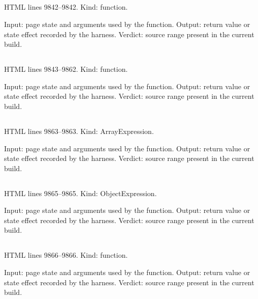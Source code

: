 \subsection*{\texttt{}}
\label{vf_538_curveSignal}
HTML lines 9842--9842. Kind: function.

Input: page state and arguments used by the function.
Output: return value or state effect recorded by the harness.
Verdict: source range present in the current build.

\subsection*{\texttt{}}
\label{vf_539_curveRowsSelected}
HTML lines 9843--9862. Kind: function.

Input: page state and arguments used by the function.
Output: return value or state effect recorded by the harness.
Verdict: source range present in the current build.

\subsection*{\texttt{}}
\label{vf_540_SERIES_PALETTE}
HTML lines 9863--9863. Kind: ArrayExpression.

Input: page state and arguments used by the function.
Output: return value or state effect recorded by the harness.
Verdict: source range present in the current build.

\subsection*{\texttt{}}
\label{vf_541_CALL_LINE}
HTML lines 9865--9865. Kind: ObjectExpression.

Input: page state and arguments used by the function.
Output: return value or state effect recorded by the harness.
Verdict: source range present in the current build.

\subsection*{\texttt{}}
\label{vf_542_curveKey}
HTML lines 9866--9866. Kind: function.

Input: page state and arguments used by the function.
Output: return value or state effect recorded by the harness.
Verdict: source range present in the current build.

